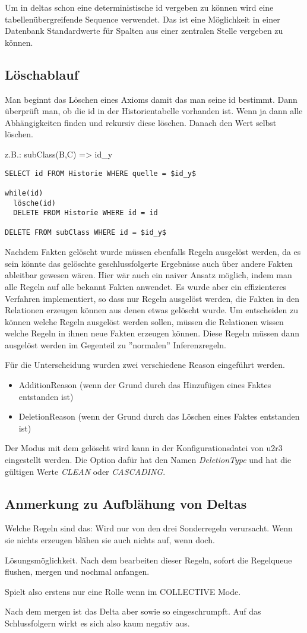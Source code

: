 Um in deltas schon eine deterministische id vergeben zu können wird eine tabellenübergreifende Sequence verwendet. Das ist eine Möglichkeit in einer Datenbank Standardwerte für Spalten aus einer zentralen Stelle vergeben zu können.

\subsection{Löschablauf}
Man beginnt das Löschen eines Axioms damit das man seine id bestimmt. Dann überprüft man, ob die id in der Historientabelle vorhanden ist. Wenn ja dann alle Abhängigkeiten finden und rekursiv diese löschen. Danach den Wert selbst löschen. 

z.B.: subClass(B,C) => id\_y
\begin{verbatim}
SELECT id FROM Historie WHERE quelle = $id_y$

while(id)
  lösche(id)
  DELETE FROM Historie WHERE id = id

DELETE FROM subClass WHERE id = $id_y$
\end{verbatim}


Nachdem Fakten gelöscht wurde müssen ebenfalls Regeln ausgelöst werden, da es sein könnte das gelöschte geschlussfolgerte Ergebnisse auch über andere Fakten ableitbar gewesen wären. 
Hier wär auch ein naiver Ansatz möglich, indem man alle Regeln auf alle bekannt Fakten anwendet. Es wurde aber ein effizienteres Verfahren implementiert, so dass nur Regeln ausgelöst werden, die Fakten in den Relationen erzeugen können aus denen etwas gelöscht wurde.
Um entscheiden zu können welche Regeln ausgelöst werden sollen, müssen die Relationen wissen welche Regeln in ihnen neue Fakten erzeugen können. Diese Regeln müssen dann ausgelöst werden im Gegenteil zu ''normalen'' Inferenzregeln.

Für die Unterscheidung wurden zwei verschiedene Reason eingeführt werden.
\begin{itemize}
  \item AdditionReason (wenn der Grund durch das Hinzufügen eines Faktes entstanden ist)
  \item DeletionReason (wenn der Grund durch das Löschen eines Faktes entstanden ist)
\end{itemize}

Der Modus mit dem gelöscht wird kann in der Konfigurationsdatei von u2r3 eingestellt werden. Die Option dafür hat den Namen \emph{DeletionType} und hat die gültigen Werte \emph{CLEAN} oder \emph{CASCADING}.

\subsection{Anmerkung zu Aufblähung von Deltas}
\label{abschnitt-aufblaehung}
Welche Regeln sind das:
Wird nur von den drei Sonderregeln verursacht. Wenn sie nichts erzeugen blähen sie auch nichts auf, wenn doch.

Lösungsmöglichkeit. Nach dem bearbeiten dieser Regeln, sofort die Regelqueue flushen, mergen und nochmal anfangen.

Spielt also erstens nur eine Rolle wenn im COLLECTIVE Mode.

Nach dem mergen ist das Delta aber sowie so eingeschrumpft. Auf das Schlussfolgern wirkt es sich also kaum negativ aus.